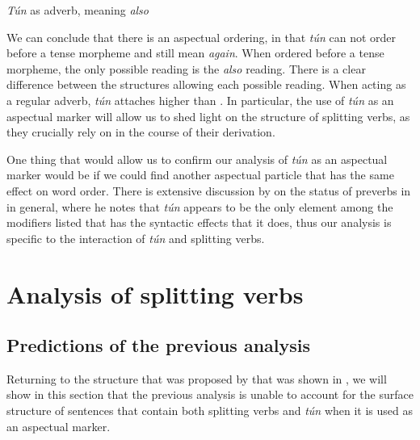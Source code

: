 \documentclass[output=paper,newtxmath,modfonts,nonflat,draftmode]{langsci/langscibook}
\begin{document}
\z



\ea \textit{Tún} as adverb, meaning \textit{also}
    
 \z
 \label{ex:parrish:ma-also} 
\z


We can conclude that there is an aspectual ordering, in that \textit{tún} can not order before a tense morpheme and still mean \textit{again}. When ordered before a tense morpheme, the only possible reading is the \textit{also} reading. There is a clear difference between the structures allowing each possible reading. When acting as a regular adverb, \textit{tún} attaches higher than . In particular, the use of \textit{tún} as an aspectual marker will allow us to shed light on the structure of splitting verbs, as they crucially rely on  in the course of their derivation.

One thing that would allow us to confirm our analysis of \textit{tún} as an aspectual marker would be if we could find another aspectual particle that has the same effect on word order. There is extensive discussion by \citet{Awoyale1974} on the status of preverbs in  in general, where he notes that \textit{tún} appears to be the only element among the modifiers listed that has the syntactic effects that it does, thus our analysis is specific to the interaction of \textit{tún} and splitting verbs.

\section{Analysis of splitting verbs}
\label{sect:parrish:analysis}

\subsection{Predictions of the previous analysis}

Returning to the structure that was proposed by \citet{Bode2007} that was shown in , we will show in this section that the previous analysis is unable to account for the surface structure of sentences that contain both splitting verbs and \textit{tún} when it is used as an aspectual marker.
\end{document}
